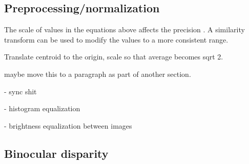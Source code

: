 



\subsection{Preprocessing/normalization} %

The scale of values in the equations above affects the precision \cite{hartley1997defense,hartley03multiview}.
A similarity transform can be used to modify the values to a more consistent range.

Translate centroid to the origin, scale so that average becomes sqrt 2.

maybe move this to a paragraph as part of another section.

- sync shit

- histogram equalization

- brightness equalization between images


\subsection{Binocular disparity} %


